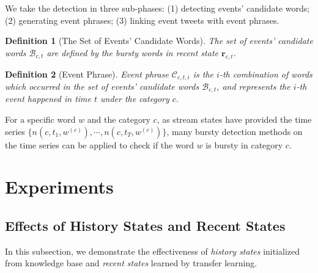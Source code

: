 \documentclass{article}
\newtheorem{rmk}{Definition}%
\begin{document}
We take the detection in three sub-phases: (1) detecting events' candidate words; (2) generating event phrases; (3) linking event tweets with event phrases.

\begin{rmk}[The Set of Events' Candidate Words] 
The set of events' candidate words \(\mathcal{B}_{c,t}\) are defined by the bursty words in recent state \(\bm{r}_{c,t}\).
\end{rmk}

\begin{rmk}[Event Phrase] 
Event phrase \(\mathcal{C}_{c,t,i}\) is the \(i\)-th combination of words which occurred in the set of events' candidate words \(\mathcal{B}_{c,t}\), and represents the \(i\)-th event happened in time \(t\) under the category \(c\).
\end{rmk}

For a specific word \(w\) and the category \(c\), as stream states have provided the time series \(\{n(c,t_{1},w^{(c)}), \cdots, n(c,t_{T},w^{(c)})\}\), many bursty detection methods on the time series can be applied to check if the word \(w\) is bursty in category \(c\).  





\section{Experiments}
\subsection{Effects of History States and Recent States}
In this subsection, we demonstrate the effectiveness of \textit{history states} initialized from knowledge base and \textit{recent states} learned by transfer learning. 
\end{document}

